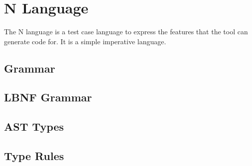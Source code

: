 \appendix
\chapter{N Language}
The N language is a test case language to express the features that the tool can generate code for.
It is a simple imperative language.
\section{Grammar}

\section{LBNF Grammar}
\section{AST Types}
\section{Type Rules}